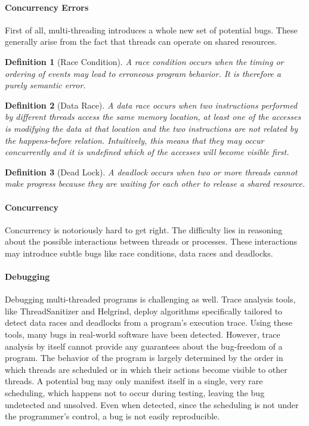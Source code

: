 \documentclass[]{article}
\newtheorem{definition}{Definition}
\begin{document}
\paragraph{Concurrency Errors}
First of all, multi-threading introduces a whole new set of potential bugs.
These generally arise from the fact that threads can operate on shared resources.
\begin{definition}[Race Condition]
A \emph{race condition} occurs when the \emph{timing} or \emph{ordering} of events may lead to erroneous program 
behavior. It is therefore a purely \emph{semantic} error.
\end{definition}
\begin{definition}[Data Race]
A \emph{data race} occurs when two instructions performed by different threads access the same memory location, at 
least one of the accesses is modifying the data at that location and the two instructions are not related by the 
\emph{happens-before relation}. Intuitively, this means that they may occur \emph{concurrently} and it is undefined
which of the accesses will become visible first.
\end{definition}
\begin{definition}[Dead Lock]
A \emph{deadlock} occurs when two or more threads cannot make progress because they are waiting for each other to 
release a shared resource.
\end{definition}


\paragraph{Concurrency}
Concurrency is notoriously hard to get right.
The difficulty lies in reasoning about the possible interactions between threads or processes.
These interactions may introduce subtle bugs like race conditions, data races and deadlocks.

\paragraph{Debugging}
Debugging multi-threaded programs is challenging as well.
Trace analysis tools, like ThreadSanitizer and Helgrind, deploy algorithms specifically tailored to detect data races 
and deadlocks from a program's execution trace.
Using these tools, many bugs in real-world software have been detected.
However, trace analysis by itself cannot provide any guarantees about the bug-freedom of a program.
The behavior of the program is largely determined by the order in which threads are scheduled or in which their
actions become visible to other threads.
A potential bug may only manifest itself in a single, very rare scheduling, which happens not to occur during 
testing, leaving the bug undetected and unsolved.
Even when detected, since the scheduling is not under the programmer's control, a bug is not easily reproducible.
\end{document}
